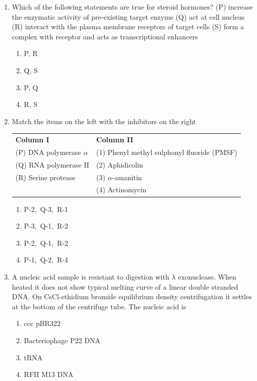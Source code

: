 \documentclass[journal,12pt,onecolumn]{IEEEtran}
\begin{document}
\begin{enumerate}
\item Which of the following statements are true for steroid hormones?  
(P) increase the enzymatic activity of pre-existing target enzyme  
(Q) act at cell nucleus  
(R) interact with the plasma membrane receptors of target cells  
(S) form a complex with receptor and acts as transcriptional enhancers
\begin{multicols}{2}
\begin{enumerate}[label=(\Alph*)]
\item P, R
\item Q, S
\item P, Q
\item R, S
\end{enumerate}
\end{multicols}

\item Match the items on the left with the inhibitors on the right

\noindent
\begin{tabular}{p{5cm} p{5cm}}
\textbf{Column I} & \textbf{Column II} \\
(P) DNA polymerase $\alpha$ & (1) Phenyl methyl sulphonyl fluoride (PMSF) \\
(Q) RNA polymerase II & (2) Aphidicolin \\
(R) Serine protease & (3) $\alpha$-amanitin \\
 & (4) Actinomycin
\end{tabular}

\begin{multicols}{2}
\begin{enumerate}[label=(\Alph*)]
\item P-2,\ Q-3,\ R-1
\item P-3,\ Q-1,\ R-2
\item P-2,\ Q-1,\ R-2
\item P-1,\ Q-2,\ R-4
\end{enumerate}
\end{multicols}

\item A nucleic acid sample is resistant to digestion with $\lambda$ exonuclease. When heated it does not show typical melting curve of a linear double stranded DNA. On CsCl-ethidium bromide equilibrium density centrifugation it settles at the bottom of the centrifuge tube. The nucleic acid is
\begin{multicols}{2}
\begin{enumerate}[label=(\Alph*)]
\item ccc pBR322
\item Bacteriophage P22 DNA
\item tRNA
\item RFII M13 DNA
\end{enumerate}
\end{multicols}


\end{enumerate}
\end{document}
